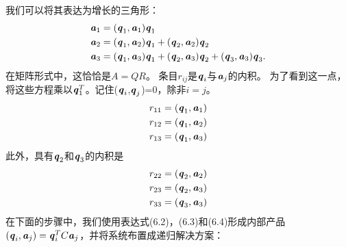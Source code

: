 我们可以将其表达为增长的三角形：
\begin{align}
	\textbf{\textit{a}}_{1}&=(\textbf{\textit{q}}_{1},\textbf{\textit{a}}_{1})\textbf{\textit{q}}_{1}
	\\
	\textbf{\textit{a}}_{2}&=(\textbf{\textit{q}}_{1},\textbf{\textit{a}}_{2})\textbf{\textit{q}}_{1}+(\textbf{\textit{q}}_{2},\textbf{\textit{a}}_{2})\textbf{\textit{q}}_{2}
	\\
	\textbf{\textit{a}}_{3}&=(\textbf{\textit{q}}_{1},\textbf{\textit{a}}_{3})\textbf{\textit{q}}_{1}+(\textbf{\textit{q}}_{2},\textbf{\textit{a}}_{3})\textbf{\textit{q}}_{2}+(\textbf{\textit{q}}_{3},\textbf{\textit{a}}_{3})\textbf{\textit{q}}_{3}.
\end{align}
在矩阵形式中，这恰恰是$A=QR$。 条目$r_{ij}$是$\textbf{\textit{q}}_{i}$与$\textbf{\textit{a}}_{j}$的内积。 为了看到这一点，将这些方程乘以$\textbf{\textit{q}}^T_1$。记住($\textbf{\textit{q}}_{i}$,$\textbf{\textit{q}}_{j}$)=$0$，除非$i =j$。
\begin{align*}
   r_{11}=(\textbf{\textit{q}}_{1},\textbf{\textit{a}}_{1})\\
   r_{12}=(\textbf{\textit{q}}_{1},\textbf{\textit{a}}_{2})\\
   r_{13}=(\textbf{\textit{q}}_{1},\textbf{\textit{a}}_{3})
\end{align*}
此外，具有$\textbf{\textit{q}}_{2}$和$\textbf{\textit{q}}_{3}$的内积是
\begin{align*}
r_{22}=(\textbf{\textit{q}}_{2},\textbf{\textit{a}}_{2})\\
r_{23}=(\textbf{\textit{q}}_{2},\textbf{\textit{a}}_{3})\\
r_{33}=(\textbf{\textit{q}}_{3},\textbf{\textit{a}}_{3})
\end{align*}
在下面的步骤中，我们使用表达式(6.2)，(6.3)和(6.4)形成内部产品$ (\textbf{\textit{q}}_{i},\textbf{\textit{a}}_{j})=\textbf{\textit{q}}^T_{i}C\textbf{\textit{a}}_{j}$，并将系统布置成递归解决方案：
